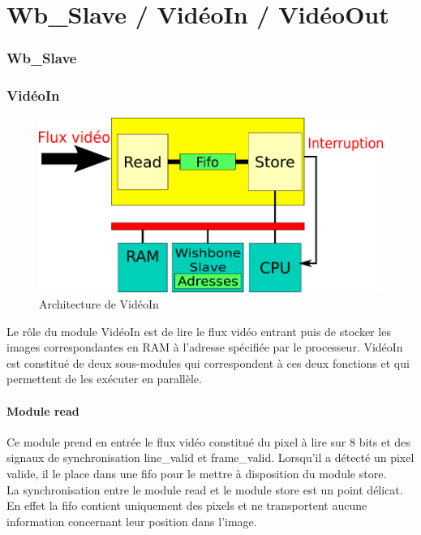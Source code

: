 {{    \part{Wb\_Slave / VidéoIn / VidéoOut}
    \section{Wb\_Slave}


    \section{VidéoIn}

\begin{figure}[!h]
	\centering
	\includegraphics[scale = 0.5]{video_in.png}
	\caption{Architecture de VidéoIn}
\end{figure}

Le rôle du module VidéoIn est de lire le flux vidéo entrant puis de stocker les images correspondantes en RAM à l'adresse spécifiée par le processeur.
VidéoIn est constitué de deux sous-modules qui correspondent à ces deux fonctions et qui permettent de les exécuter en parallèle. 


\subsection{Module read}
Ce module prend en entrée le flux vidéo constitué du pixel à lire sur 8 bits et des signaux de synchronisation line\_valid et frame\_valid.
Lorsqu'il a détecté un pixel valide, il le place dans une fifo pour le mettre à disposition du module store.\\
La synchronisation entre le module read et le module store est un point délicat. 
En effet la fifo contient uniquement des pixels et ne transportent aucune information concernant leur position dans l'image. 

}}
